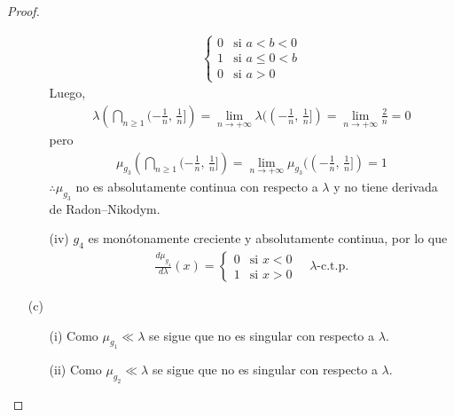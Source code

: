 \documentclass[12pt]{article}
\begin{document}
\begin{proof}
\begin{itemize}
\begin{itemize}
\begin{align*}
\begin{cases}
                                                                             0 & \text{si } a < b < 0    \\
                                                                             1 & \text{si } a \leq 0 < b \\
                                                                             0 & \text{si } a > 0
                                                                         \end{cases}
                        \end{align*} Luego, \begin{align*}
                            \lambda\left( \bigcap_{n \geq 1} (-\frac{1}{n}\text{, }\frac{1}{n}] \right) = \lim_{n \to +\infty} \lambda((  -\frac{1}{n}\text{, }\frac{1}{n}]) = \lim_{n \to +\infty} \frac{2}{n} = 0
                        \end{align*} pero \begin{align*}
                            \mu_{g_3}\left( \bigcap_{n \geq 1} (-\frac{1}{n}\text{, }\frac{1}{n}] \right) = \lim_{n \to +\infty} \mu_{g_3}((-\frac{1}{n}\text{, }\frac{1}{n}]) = 1
                        \end{align*} $\therefore \mu_{g_3}$ no es absolutamente continua con respecto a $\lambda$ y no tiene derivada de Radon–Nikodym.
                  \item[(iv)] $g_4$ es monótonamente creciente y absolutamente continua, por lo que \begin{align*}
                            \frac{d\mu_{g_4}}{d\lambda}(x) = \begin{cases}
                                                                 0 & \text{si } x < 0 \\
                                                                 1 & \text{si } x > 0
                                                             \end{cases} \quad \lambda\text{-c.t.p.}
                        \end{align*}
              \end{itemize}
        \item[(c)] \begin{itemize}
                  \item[(i)] Como $\mu_{g_1} \ll \lambda$ se sigue que no es singular con respecto a $\lambda$.
                  \item[(ii)] Como $\mu_{g_2} \ll \lambda$ se sigue que no es singular con respecto a $\lambda$.

\end{itemize}
\end{itemize}
\end{proof}
\end{document}

